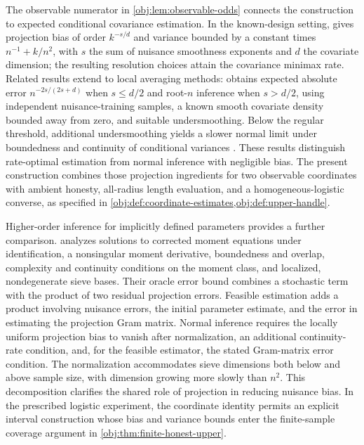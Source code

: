 The observable numerator in \cref{obj:lem:observable-odds} connects the construction to expected conditional covariance estimation. In the known-design setting, \citet[version 5, Theorem 1 and Corollary 1]{McGrath2026} gives projection bias of order \(k^{-s/d}\) and variance bounded by a constant times \(n^{-1}+k/n^2\), with \(s\) the sum of nuisance smoothness exponents and \(d\) the covariate dimension; the resulting resolution choices attain the covariance minimax rate. Related results extend to local averaging methods: \citet[arXiv version 3, Assumption 4 and Theorem 2]{McCleanBalakrishnanKennedyWasserman2024DCDR} obtains expected absolute error \(n^{-2s/(2s+d)}\) when \(s\le d/2\) and root-\(n\) inference when \(s>d/2\), using independent nuisance-training samples, a known smooth covariate density bounded away from zero, and suitable undersmoothing. Below the regular threshold, additional undersmoothing yields a slower normal limit under boundedness and continuity of conditional variances \citep[arXiv version 3, Theorem 3]{McCleanBalakrishnanKennedyWasserman2024DCDR}. These results distinguish rate-optimal estimation from normal inference with negligible bias. The present construction combines those projection ingredients for two observable coordinates with ambient honesty, all-radius length evaluation, and a homogeneous-logistic converse, as specified in \cref{obj:def:coordinate-estimates,obj:def:upper-handle}.

Higher-order inference for implicitly defined parameters provides a further comparison. \citet[Section 3.3, Assumptions 1 and 3--9, Theorems 1--4]{ZhangLiuZhang2026GeneralTreatmentHOIF} analyzes solutions to corrected moment equations under identification, a nonsingular moment derivative, boundedness and overlap, complexity and continuity conditions on the moment class, and localized, nondegenerate sieve bases. Their oracle error bound combines a stochastic term with the product of two residual projection errors. Feasible estimation adds a product involving nuisance errors, the initial parameter estimate, and the error in estimating the projection Gram matrix. Normal inference requires the locally uniform projection bias to vanish after normalization, an additional continuity-rate condition, and, for the feasible estimator, the stated Gram-matrix error condition. The normalization accommodates sieve dimensions both below and above sample size, with dimension growing more slowly than \(n^2\). This decomposition clarifies the shared role of projection in reducing nuisance bias. In the prescribed logistic experiment, the coordinate identity permits an explicit interval construction whose bias and variance bounds enter the finite-sample coverage argument in \cref{obj:thm:finite-honest-upper}.

